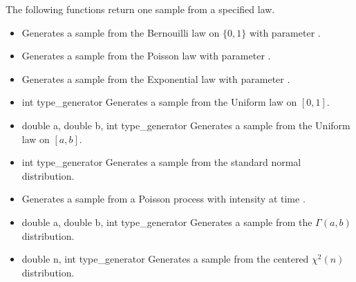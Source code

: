 The following functions return one sample from a specified law.
\begin{itemize}
\item {}
  \sshortdescribe Generates a sample from the Bernouilli law on $\{0, 1\}$ with
  parameter .

\item {}
  \sshortdescribe Generates a sample from the Poisson law with
  parameter .

\item {}
  \sshortdescribe Generates a sample from the Exponential law with
  parameter .

\item {} {int type_generator}
  \sshortdescribe Generates a sample from the Uniform law on $[0, 1]$.

\item {} {double a, double b, int
    type_generator}
  \sshortdescribe Generates a sample from the Uniform law on $[a, b]$.

\item {} {int type_generator}
  \sshortdescribe Generates a sample from the standard normal distribution.

\item {}
  \sshortdescribe Generates a sample from a Poisson process with intensity
   at time .

\item {} {double a, double b, int type_generator}
  \sshortdescribe Generates a sample from the $\Gamma(a, b)$ distribution.

\item {} {double n, int type_generator}
  \sshortdescribe Generates a sample from the centered $\chi^2(n)$ distribution.
\end{itemize}

